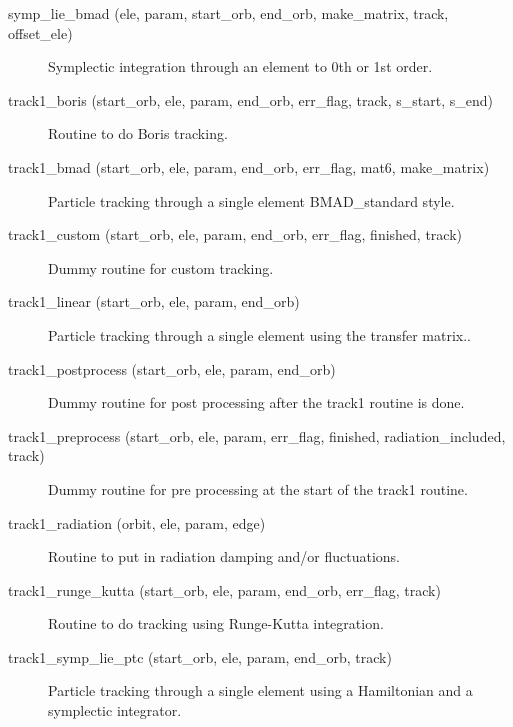 \begin{description}

\label{r:symp.lie.bmad}
\item[symp_lie_bmad (ele, param, start_orb, end_orb, make_matrix, track, offset_ele)] \Newline
Symplectic integration through an element to 0th or 1st order.

\label{r:track1.boris}
\item[track1_boris (start_orb, ele, param, end_orb, err_flag, track, s_start, s_end)] \Newline
Routine to do Boris tracking.  

\label{r:track1.bmad}
\item[track1_bmad (start_orb, ele, param, end_orb, err_flag, mat6, make_matrix)] \Newline
Particle tracking through a single element BMAD_standard style. 

\item[track1_custom (start_orb, ele, param, end_orb, err_flag, finished, track)] \Newline
Dummy routine for custom tracking.

\label{r:track1.linear}
\item[track1_linear (start_orb, ele, param, end_orb)] \Newline
Particle tracking through a single element using the transfer matrix.. 

\item[track1_postprocess (start_orb, ele, param, end_orb)] \Newline 
Dummy routine for post processing after the track1 routine is done.

\item[track1_preprocess (start_orb, ele, param, err_flag, finished, radiation_included, track)] \Newline 
Dummy routine for pre processing at the start of the track1 routine.

\label{r:track1.radiation}
\item[track1_radiation (orbit, ele, param, edge)] \Newline
Routine to put in radiation damping and/or fluctuations. 

\label{r:track1.runge.kutta}
\item[track1_runge_kutta (start_orb, ele, param, end_orb, err_flag, track)] \Newline
Routine to do tracking using Runge-Kutta integration. 

\label{r:track1.symp.lie.ptc}
\item[track1_symp_lie_ptc (start_orb, ele, param, end_orb, track)] \Newline
Particle tracking through a single element using a Hamiltonian and a 
symplectic integrator. 


\end{description}
